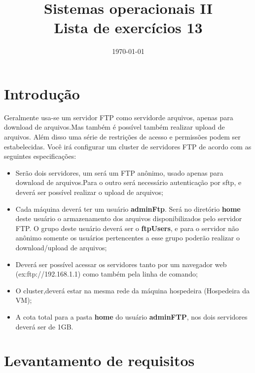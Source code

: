 \documentclass[
	12pt,				%
	openany,			%
	a4paper,			%
	chapter=TITLE,		%
	section=TITLE,		%
	english,
	brazil				%
]{abntex2}
\title{Sistemas operacionais II \\ Lista de exercícios 13}
\date{\today}
\begin{document}
\maketitle

\chapter{Introdução}

Geralmente usa-se um servidor FTP como servidorde arquivos, apenas para download de arquivos.Mas também é possível também realizar upload de arquivos. Além disso uma série de restrições de acesso e permissões podem ser estabelecidas. Você irá configurar um cluster de servidores FTP de acordo com as seguintes especificações:
\begin{itemize}
	\item Serão dois servidores, um será um FTP anônimo, usado apenas para download de arquivos.Para o outro será necessário autenticação por sftp, e deverá ser possível realizar o upload de arquivos;
	\item Cada máquina deverá ter um usuário \textbf{adminFtp}. Será no diretório \textbf{home} deste usuário o armazenamento dos arquivos disponibilizados pelo servidor FTP. O grupo deste usuário deverá ser o \textbf{ftpUsers}, e para o servidor não anônimo somente os usuários pertencentes a esse grupo poderão realizar o download/upload de arquivos;
	\item Deverá ser possível acessar os servidores tanto por um navegador web (ex:ftp://192.168.1.1) como também pela linha de comando;
	\item O cluster,deverá estar na mesma rede da máquina hospedeira (Hospedeira da VM);
	\item A cota total para a pasta \textbf{home} do usuário \textbf{adminFTP}, nos dois servidores deverá ser de 1GB. 
\end{itemize}


\chapter{Levantamento de requisitos}
\end{document}
